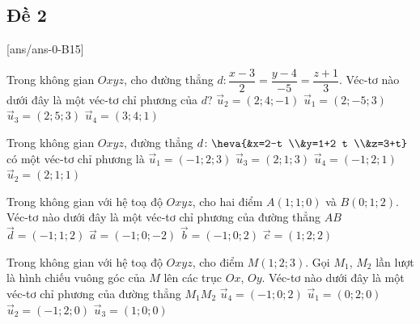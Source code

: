 \subsection{Đề 2}
[ans/ans-0-B15]
\caulc
\begin{ex}%
	Trong không gian $Oxyz$, cho đường thẳng $d\colon \dfrac{x-3}{2}=\dfrac{y-4}{-5}=\dfrac{z+1}{3}$. Véc-tơ nào dưới đây là một véc-tơ chỉ phương của $d$?
	\choice
	{$\overrightarrow{u}_2=(2; 4;-1)$}
	{\True $\overrightarrow{u}_1=(2;-5; 3)$}
	{$\overrightarrow{u}_3=(2; 5; 3)$}
	{$\overrightarrow{u}_4=(3; 4; 1)$}
\end{ex}
\begin{ex}%
	Trong không gian $Oxyz$, đường thẳng $d\colon \heva{&x=2-t \\&y=1+2 t \\&z=3+t}$ có một véc-tơ chỉ phương là
	\choice
	{$\overrightarrow{u}_1=(-1; 2; 3)$}
	{$\overrightarrow{u}_3=(2; 1; 3)$}
	{\True $\overrightarrow{u}_4=(-1; 2; 1)$}
	{$\overrightarrow{u}_2=(2; 1; 1)$}
\end{ex}
\begin{ex}%
	Trong không gian với hệ toạ độ $Oxyz$, cho hai điểm $A(1; 1; 0)$ và $B(0;1;2)$. Véc-tơ nào dưới đây là một véc-tơ chỉ phương của đường thẳng $AB$
	\choice
	{$\overrightarrow{d}=(-1; 1; 2)$}
	{$\overrightarrow{a}=(-1; 0;-2)$}
	{\True $\overrightarrow{b}=(-1; 0; 2)$}
	{$\overrightarrow{c}=(1; 2; 2)$}
\end{ex}
\begin{ex}%
	Trong không gian với hệ toạ độ $Oxyz$, cho điểm $M(1; 2; 3)$. Gọi $M_1$, $M_2$ lần lượt là hình chiếu vuông góc của $M$ lên các trục $Ox$, $Oy$. Véc-tơ nào dưới đây là một véc-tơ chỉ phương của đường thẳng $M_1M_2$
	\choice
	{$\overrightarrow{u}_4=(-1; 0; 2)$}
	{$\overrightarrow{u}_1=(0; 2; 0)$}
	{\True $\overrightarrow{u}_2=(-1; 2; 0)$}
	{$\overrightarrow{u}_3=(1; 0; 0)$}
\end{ex}

